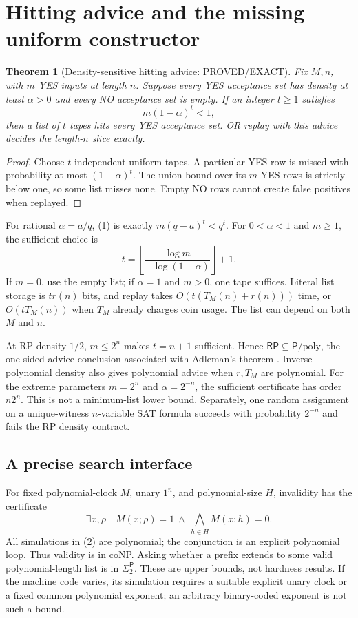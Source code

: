 \documentclass[11pt]{article}
\newtheorem{theorem}{Theorem}[section]
\newcommand{\Pclass}{\mathsf P}
\newcommand{\RP}{\mathsf{RP}}
\begin{document}
\section{Hitting advice and the missing uniform constructor}
\begin{theorem}[Density-sensitive hitting advice: PROVED/EXACT]
Fix $M,n$, with $m$ YES inputs at length $n$. Suppose every YES acceptance set
has density at least $\alpha>0$ and every NO acceptance set is empty. If an
integer $t\ge1$ satisfies
\[
 m(1-\alpha)^t<1,                                      \tag{1}
\]
then a list of $t$ tapes hits every YES acceptance set. OR replay with this
advice decides the length-$n$ slice exactly.
\end{theorem}
\begin{proof}
Choose $t$ independent uniform tapes. A particular YES row is missed with
probability at most $(1-\alpha)^t$. The union bound over its $m$ YES rows
is strictly below one, so some list misses none. Empty NO rows cannot create
false positives when replayed.
\end{proof}
For rational $\alpha=a/q$, (1) is exactly $m(q-a)^t<q^t$.
For $0<\alpha<1$ and $m\ge1$, the sufficient choice is
\[
 t=\left\lfloor\frac{\log m}{-\log(1-\alpha)}\right\rfloor+1.
\]
If $m=0$, use the empty list; if $\alpha=1$ and $m>0$, one tape suffices.
Literal list storage is $tr(n)$ bits, and replay takes
$O(t(T_M(n)+r(n)))$ time, or $O(tT_M(n))$ when $T_M$ already charges coin
usage. The list can depend on both $M$ and $n$.

At RP density $1/2$, $m\le2^n$ makes $t=n+1$ sufficient. Hence
$\RP\subseteq\Pclass/\mathrm{poly}$, the one-sided advice conclusion
associated with Adleman's theorem \cite{adleman,r36,r38}. Inverse-polynomial
density also gives polynomial advice when $r,T_M$ are polynomial. For the
extreme parameters $m=2^n$ and $\alpha=2^{-n}$, the sufficient certificate
has order $n2^n$. This is not a minimum-list lower bound. Separately, one
random assignment on a unique-witness $n$-variable SAT formula succeeds with
probability $2^{-n}$ and fails the RP density contract.

\subsection*{A precise search interface}
For fixed polynomial-clock $M$, unary $1^n$, and polynomial-size $H$,
invalidity has the certificate
\[
 \exists x,\rho\quad M(x;\rho)=1\ \wedge\
                      \bigwedge_{h\in H}M(x;h)=0.       \tag{2}
\]
All simulations in (2) are polynomial; the conjunction is an explicit
polynomial loop. Thus validity is in coNP. Asking whether a prefix extends
to some valid polynomial-length list is in $\Sigma_2^{\Pclass}$.
These are upper bounds, not hardness results. If the machine code varies,
its simulation requires a suitable explicit unary clock or a fixed common
polynomial exponent; an arbitrary binary-coded exponent is not such a bound.
\end{document}
